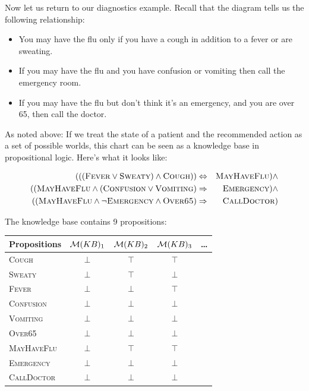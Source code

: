 \documentclass[11pt]{article}
\begin{document}
% 

Now let us return to our diagnostics example. Recall that the diagram tells us the following relationship:

\begin{itemize}
\item  You may have the flu only if you have a cough in addition to a fever or are sweating. 
\item  If you may have the flu and you have confusion or vomiting then call the emergency room.
\item  If you may have the flu but don't think it's an emergency, and you are over 65, then call the doctor.
\end{itemize}

\noindent As noted above: If we treat the state of a patient and the recommended action as a set of possible worlds, this chart can be seen as a knowledge base in propositional logic.  Here's what it looks like:

\begin{eqnarray*}
 (((\mathrm{\textsc{Fever}} \lor \mathrm{\textsc{Sweaty}}) \land \mathrm{\textsc{Cough}})) &\Leftrightarrow& \mathrm{\textsc{MayHaveFlu}}) \land \\
 ((\mathrm{\textsc{MayHaveFlu}} \land (\mathrm{\textsc{Confusion}} \lor \mathrm{\textsc{Vomiting}}) &\Rightarrow& \mathrm{\textsc{Emergency}}) \land \\
 ((\mathrm{\textsc{MayHaveFlu}} \land \lnot \mathrm{\textsc{Emergency}} \land \mathrm{\textsc{Over65}}) &\Rightarrow& \mathrm{\textsc{CallDoctor}}) \\
\end{eqnarray*}

The knowledge base contains 9 propositions:

\air
\begin{center}
  \begin{tabular}{lcccc}
    \toprule
    Propositions &  $\mathcal{M}(KB)_1$ & $\mathcal{M}(KB)_2$ &  $\mathcal{M}(KB)_3$ & \ldots  \\
    \midrule
    \textsc{Cough}    & $\bot$ & $\top$ &  $\top$ & \\ 
    \textsc{Sweaty}   & $\bot$ & $\top$ & $\bot$ &\\ 
    \textsc{Fever}    & $\bot$ & $\bot$& $\top$ &\\ 
    \textsc{Confusion}& $\bot$ & $\bot$& $\bot$ &\\ 
    \textsc{Vomiting} & $\bot$ & $\bot$&$\bot$ &\\ 
    \textsc{Over65}   & $\bot$ & $\bot$&$\bot$ & \\ 
    \midrule
    \textsc{MayHaveFlu} & $\bot$ & $\top$&$\top$ &\\ 
    \textsc{Emergency} & $\bot$  & $\bot$&$\bot$ &\\ 
    \textsc{CallDoctor} & $\bot$ & $\bot$  &$\bot$ &\\ 
    \bottomrule
  \end{tabular}
\end{center}
\end{document}
